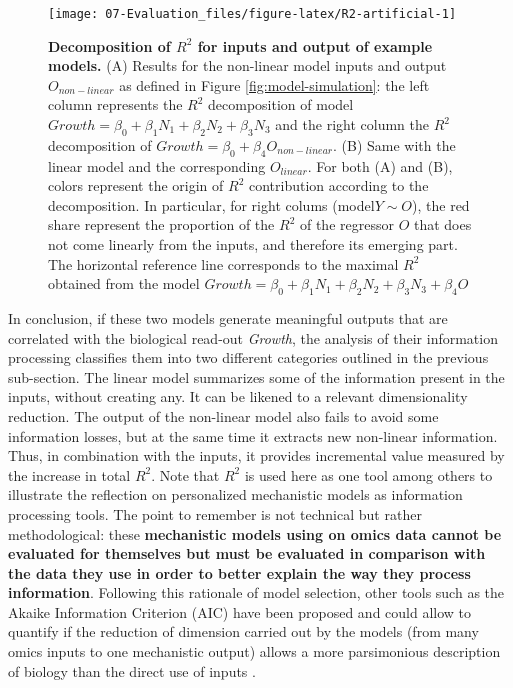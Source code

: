 \documentclass[a4paper,12pt,twoside,onecolumn,openright,final,oldfontcommands]{memoir}
\begin{document}
\begin{figure}

{\centering \texttt{[image: 07-Evaluation\_files/figure-latex/R2-artificial-1]} 

}

\caption[Decomposition of $R^2$ for inputs and output of example models]{\textbf{Decomposition of \(R^2\) for inputs
and output of example models.} (A) Results for the non-linear model
inputs and output \(O_{non-linear}\) as defined in Figure
\ref{fig:model-simulation}: the left column represents the \(R^2\)
decomposition of model
\(Growth = \beta_0+\beta_1 N_1+\beta_2 N_2 + \beta_3 N_3\) and the right
column the \(R^2\) decomposition of
\(Growth = \beta_0+ \beta_4 O_{non-linear}\). (B) Same with the linear
model and the corresponding \(O_{linear}\). For both (A) and (B), colors
represent the origin of \(R^2\) contribution according to the
decomposition. In particular, for right colums (model\(Y\sim O\)), the
red share represent the proportion of the \(R^2\) of the regressor \(O\)
that does not come linearly from the inputs, and therefore its emerging
part. The horizontal reference line corresponds to the maximal \(R^2\)
obtained from the model
\(Growth = \beta_0+\beta_1 N_1+\beta_2 N_2 + \beta_3 N_3 + \beta_4O\)}\label{fig:R2-artificial}
\end{figure}


















In conclusion, if these two models generate meaningful outputs that are
correlated with the biological read-out \emph{Growth}, the analysis of
their information processing classifies them into two different
categories outlined in the previous sub-section. The linear model
summarizes some of the information present in the inputs, without
creating any. It can be likened to a relevant dimensionality reduction.
The output of the non-linear model also fails to avoid some information
losses, but at the same time it extracts new non-linear information.
Thus, in combination with the inputs, it provides incremental value
measured by the increase in total \(R^2\). Note that \(R^2\) is used
here as one tool among others to illustrate the reflection on
personalized mechanistic models as information processing tools. The
point to remember is not technical but rather methodological: these
\textbf{mechanistic models using on omics data cannot be evaluated for
themselves but must be evaluated in comparison with the data they use in
order to better explain the way they process information}. Following
this rationale of model selection, other tools such as the Akaike
Information Criterion (AIC) have been proposed and could allow to
quantify if the reduction of dimension carried out by the models (from
many omics inputs to one mechanistic output) allows a more parsimonious
description of biology than the direct use of inputs
\citep{kirk2013model}.
\end{document}
